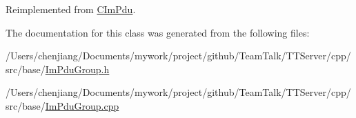 Reimplemented from \hyperlink{class_c_im_pdu_a887912f445b3e864d33f9e7f2325f1fc}{C\+Im\+Pdu}.



The documentation for this class was generated from the following files\+:\begin{DoxyCompactItemize}
\item 
/\+Users/chenjiang/\+Documents/mywork/project/github/\+Team\+Talk/\+T\+T\+Server/cpp/src/base/\hyperlink{_im_pdu_group_8h}{Im\+Pdu\+Group.\+h}\item 
/\+Users/chenjiang/\+Documents/mywork/project/github/\+Team\+Talk/\+T\+T\+Server/cpp/src/base/\hyperlink{_im_pdu_group_8cpp}{Im\+Pdu\+Group.\+cpp}\end{DoxyCompactItemize}
